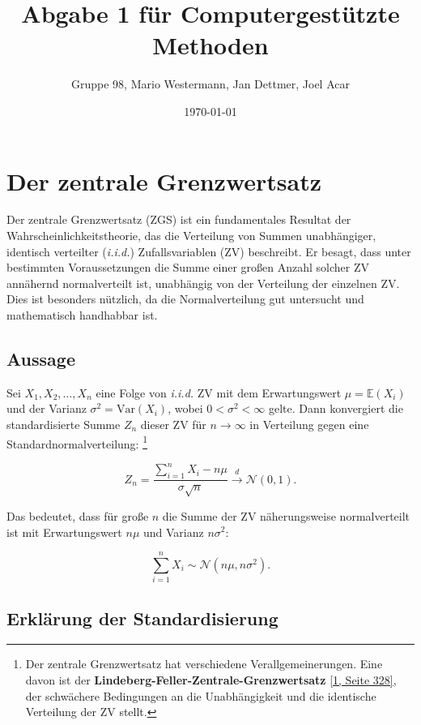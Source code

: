 \documentclass{article}
\title{Abgabe 1 für Computergestützte Methoden}
\author{Gruppe 98, Mario Westermann, Jan Dettmer, Joel Acar}
\date{\today}
\begin{document}
\maketitle

\tableofcontents

\newpage

\section{Der zentrale Grenzwertsatz}

Der zentrale Grenzwertsatz (ZGS) ist ein fundamentales Resultat der Wahrscheinlichkeitstheorie, 
das die Verteilung von Summen unabhängiger, identisch verteilter (\textit{i.i.d.}) Zufallsvariablen (ZV) beschreibt.
Er besagt, dass unter bestimmten Voraussetzungen die Summe einer großen Anzahl solcher ZV
annähernd normalverteilt ist, unabhängig von der Verteilung der einzelnen ZV. Dies ist besonders nützlich, da die Normalverteilung gut untersucht und mathematisch handhabbar ist.

\subsection{Aussage}

Sei \( X_1, X_2, \ldots, X_n \) eine Folge von \textit{i.i.d.} ZV mit dem Erwartungswert \(\mu = \mathbb{E}(X_i)\) und der Varianz \(\sigma^2 = \text{Var}(X_i)\), wobei \( 0 < \sigma^2 < \infty \) gelte. Dann konvergiert die standardisierte Summe \( Z_n \) dieser ZV für \( n \to \infty \) in Verteilung gegen eine Standardnormalverteilung: \footnote{\label{footnote-gwz}Der zentrale Grenzwertsatz hat verschiedene Verallgemeinerungen. Eine davon ist der \textbf{Lindeberg-Feller-Zentrale-Grenzwertsatz} \hyperlink{Klenke2013}{[1, Seite 328]}, der schwächere Bedingungen an die Unabhängigkeit und die identische Verteilung der ZV stellt.}

\[
Z_n = \frac{\sum_{i=1}^n X_i - n\mu}{\sigma \sqrt{n}} \overset{d}{\to} \mathcal{N}(0,1). \tag{1} \label{eq:formel1}
\]

Das bedeutet, dass für große \( n \) die Summe der ZV näherungsweise normalverteilt ist mit Erwartungswert \( n\mu \) und Varianz \( n\sigma^2 \):

\[
\sum_{i=1}^n X_i \sim \mathcal{N}(n\mu, n\sigma^2). \tag{2} \label{eq:formel2}
\]

\subsection{Erklärung der Standardisierung}
\end{document}
